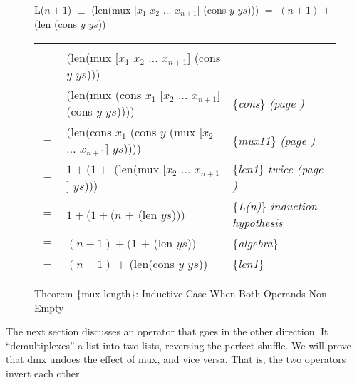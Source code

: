 \begin{figure}
\begin{center}
L($n+1$) $\equiv$ \textsf{(len(mux [$x_1$ $x_2$ $\dots$ $x_{n+1}$] (cons $y$ $ys$))) $=$ $(n+1)$ $+$ (len (cons $y$ $ys$))}
\begin{tabular}{lll}
\hline\\[-1.0em]
    & \textsf{(len(mux [$x_1$ $x_2$ $\dots$ $x_{n+1}$] (cons $y$ $ys$)))}        &   \\
$=$ & \textsf{(len(mux (cons $x_1$ [$x_2$ $\dots$ $x_{n+1}$] (cons $y$ $ys$))))} & \{\emph{cons}\} \emph{(page \pageref{first-rest-cons})} \\
$=$ & \textsf{(len(cons $x_1$ (cons $y$ (mux [$x_2$ $\dots$ $x_{n+1}$] $ys$))))} & \{\emph{mux11}\} \emph{(page \pageref{axioms:mux})}\\
$=$ & $1 + (1 +$ \textsf{(len(mux [$x_2$ $\dots$ $x_{n+1}$] $ys$))})             & \{\emph{len1}\} \emph{twice (page \pageref{len-equations})}\\
$=$ & $1 + (1 + (n$ $+$ \textsf{(len $ys$)}$))$                                  & \{\emph{L(n)}\} \emph{induction hypothesis} \\
$=$ & $(n + 1) + (1$ $+$ \textsf{(len $ys$)}$)$                                  & \{\emph{algebra}\} \\
$=$ & $(n + 1)$ $+$ \textsf{(len(cons $y$ $ys$))}                                & \{\emph{len1}\} \\
\end{tabular}
\end{center}
\caption{Theorem \{mux-length\}: Inductive Case When Both Operands Non-Empty}
\label{fig:prf-mux-len-induc}
\end{figure}

The next section discusses an operator that goes in the other direction.
It ``demultiplexes'' a list into two lists, reversing the perfect shuffle.
We will prove that \textsf{dmx} undoes the effect of \textsf{mux}, and vice versa.
That is, the two operators invert each other.

